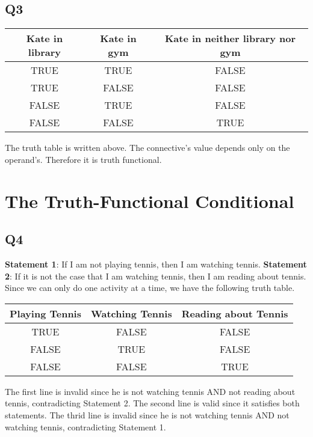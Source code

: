\documentclass[12pt]{article}
\begin{document}
\subsection{Q3}

\begin{tabular} {|c|c|c|}
    \hline
    Kate in library & Kate in gym & Kate in neither library nor gym \\
    \hline
    TRUE & TRUE & FALSE \\
    \hline
    TRUE & FALSE & FALSE \\
    \hline
    FALSE & TRUE & FALSE \\
    \hline
    FALSE & FALSE & TRUE \\
    \hline
\end{tabular}
\newline
The truth table is written above. The connective's value depends only on the operand's. 
Therefore it is truth functional.

\section{The Truth-Functional Conditional}
\subsection{Q4}
\textbf{Statement 1}: If I am not playing tennis, then I am watching tennis.
\newline
\textbf{Statement 2}: If it is not the case that I am watching tennis, then I am reading about tennis.
Since we can only do one activity at a time, we have the following truth table.
\newline
\begin{tabular}{|c|c|c|}
    \hline 
    Playing Tennis & Watching Tennis & Reading about Tennis \\
    \hline
    TRUE & FALSE & FALSE \\
    \hline
    FALSE & TRUE & FALSE \\
    \hline
    FALSE & FALSE & TRUE \\
    \hline
\end{tabular}
\newline
The first line is invalid since he is not watching tennis AND not reading about tennis, 
contradicting Statement 2.
\newline
The second line is valid since it satisfies both statements.
\newline
The thrid line is invalid since he is not watching tennis AND not watching tennis, contradicting 
Statement 1.
\end{document}
